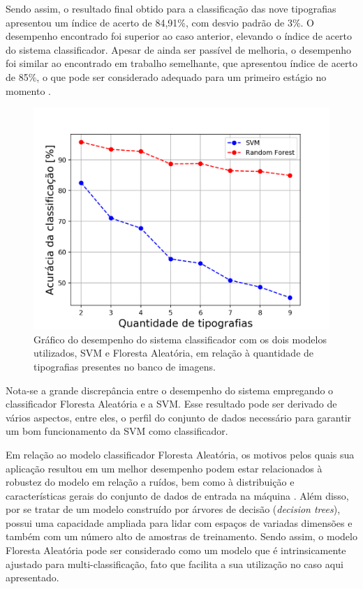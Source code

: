 

Sendo assim, o resultado final obtido para a classificação das nove tipografias apresentou um índice de acerto de 84,91\%, com desvio padrão de 3\%. O desempenho encontrado foi superior ao caso anterior, elevando o índice de acerto do sistema classificador. Apesar de ainda ser passível de melhoria, o desempenho foi similar ao encontrado em trabalho semelhante, que apresentou índice de acerto de 85\%, o que pode ser considerado adequado para um primeiro estágio no momento .

\begin{figure}[H]
 \centering
  \includegraphics[width=0.7\linewidth]{figuras/graficosvmrfc.pdf}
  \caption{Gráfico do desempenho do sistema classificador com os dois modelos utilizados, SVM e Floresta Aleatória, em relação à quantidade de tipografias presentes no banco de imagens.}
  \label{fig:grafico2}
\end{figure}

Nota-se a grande discrepância entre o desempenho do sistema empregando o classificador Floresta Aleatória e a SVM. Esse resultado pode ser derivado de vários aspectos, entre eles, o perfil do conjunto de dados necessário para garantir um bom funcionamento da SVM como classificador.


Em relação ao modelo classificador Floresta Aleatória, os motivos pelos quais sua aplicação resultou em um melhor desempenho podem estar relacionados à robustez do modelo em relação a ruídos, bem como à distribuição e características gerais do conjunto de dados de entrada na máquina . Além disso, por se tratar de um modelo construído por árvores de decisão (\textit{decision trees}), possui uma capacidade ampliada para lidar com espaços de variadas dimensões e também com um número alto de amostras de treinamento. Sendo assim, o modelo Floresta Aleatória pode ser considerado como um modelo que é intrinsicamente ajustado para multi-classificação, fato que facilita a sua utilização no caso aqui apresentado.

